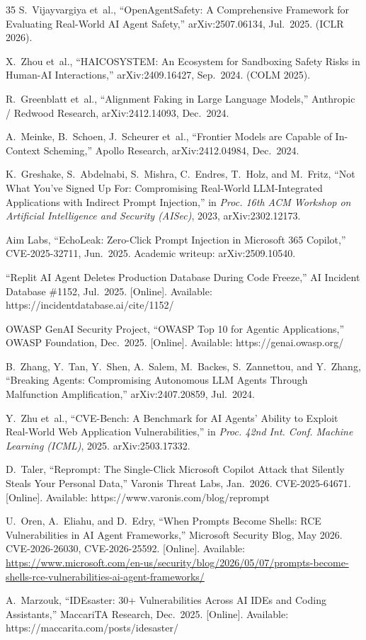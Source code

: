 \documentclass{IEEEoj-data}
\newcommand{\replaced}[2]{#1}
\newcommand{\added}[1]{#1}
\begin{document}
\begin{thebibliography}{35}
\added{\replaced{S.}{M.}~Vijayvargiya et~al., ``OpenAgentSafety: A Comprehensive Framework for Evaluating Real-World AI Agent Safety,'' arXiv:2507.06134, Jul.\ 2025. (ICLR 2026).}

\added{X.~Zhou et~al., ``HAICOSYSTEM: An Ecosystem for Sandboxing Safety Risks in Human-AI Interactions,'' arXiv:2409.16427, Sep.\ 2024. (COLM 2025).}

\added{R.~Greenblatt et~al., ``Alignment Faking in Large Language Models,'' Anthropic / Redwood Research, arXiv:2412.14093, Dec.\ 2024.}

\added{A.~Meinke, B.~Schoen, J.~Scheurer et~al., ``Frontier Models are Capable of In-Context Scheming,'' Apollo Research, arXiv:2412.04984, Dec.\ 2024.}

\added{K.~Greshake, S.~Abdelnabi, S.~Mishra, C.~Endres, T.~Holz, and M.~Fritz, ``Not What You've Signed Up For: Compromising Real-World LLM-Integrated Applications with Indirect Prompt Injection,'' in {\it Proc. 16th ACM Workshop on Artificial Intelligence and Security (AISec)}, 2023, arXiv:2302.12173.}

\added{Aim Labs, ``EchoLeak: Zero-Click Prompt Injection in Microsoft 365 Copilot,'' CVE-2025-32711, Jun.\ 2025. Academic writeup: arXiv:2509.10540.}

\added{``Replit AI Agent Deletes Production Database During Code Freeze,'' AI Incident Database \#1152, Jul.\ 2025. [Online]. Available: https://incidentdatabase.ai/cite/1152/}

\added{OWASP GenAI Security Project, ``OWASP Top 10 for Agentic Applications,'' OWASP Foundation, Dec.\ 2025. [Online]. Available: https://genai.owasp.org/}

\added{B.~Zhang, Y.~Tan, Y.~Shen, A.~Salem, M.~Backes, S.~Zannettou, and Y.~Zhang, ``Breaking Agents: Compromising Autonomous LLM Agents Through Malfunction Amplification,'' arXiv:2407.20859, Jul.\ 2024.}

\added{Y.~Zhu et~al., ``CVE-Bench: A Benchmark for AI Agents' Ability to Exploit Real-World Web Application Vulnerabilities,'' in {\it Proc. 42nd Int. Conf. Machine Learning (ICML)}, 2025. arXiv:2503.17332.}

\added{D.~Taler, ``Reprompt: The Single-Click Microsoft Copilot Attack that Silently Steals Your Personal Data,'' Varonis Threat Labs, Jan.\ 2026. CVE-2025-64671. [Online]. Available: https://www.varonis.com/blog/reprompt}

\added{U.~Oren, A.~Eliahu, and D.~Edry, ``When Prompts Become Shells: RCE Vulnerabilities in AI Agent Frameworks,'' Microsoft Security Blog, May 2026. CVE-2026-26030, CVE-2026-25592. [Online]. Available: }\url{https://www.microsoft.com/en-us/security/blog/2026/05/07/prompts-become-shells-rce-vulnerabilities-ai-agent-frameworks/}

\added{A.~Marzouk, ``IDEsaster: 30+ Vulnerabilities Across AI IDEs and Coding Assistants,'' MaccariTA Research, Dec.\ 2025. [Online]. Available: https://maccarita.com/posts/idesaster/}

\end{thebibliography}
\end{document}
